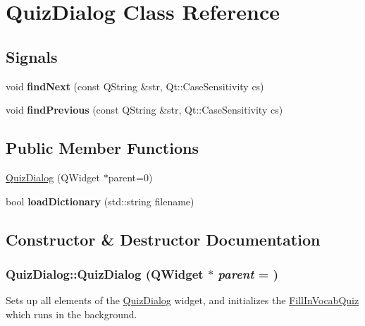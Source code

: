 \hypertarget{classQuizDialog}{
\section{QuizDialog Class Reference}
\label{classQuizDialog}
}
\subsection*{Signals}
\begin{DoxyCompactItemize}
\item 
\hypertarget{classQuizDialog_a958d04f6d98d7478d251562d649cc860}{
void {\bfseries findNext} (const QString \&str, Qt::CaseSensitivity cs)}
\label{classQuizDialog_a958d04f6d98d7478d251562d649cc860}

\item 
\hypertarget{classQuizDialog_a7f553273862f4b23f10cf0be184bb3c5}{
void {\bfseries findPrevious} (const QString \&str, Qt::CaseSensitivity cs)}
\label{classQuizDialog_a7f553273862f4b23f10cf0be184bb3c5}

\end{DoxyCompactItemize}
\subsection*{Public Member Functions}
\begin{DoxyCompactItemize}
\item 
\hyperlink{classQuizDialog_a705eca03231d2f3c68f93692b1854f7e}{QuizDialog} (QWidget $\ast$parent=0)
\item 
\hypertarget{classQuizDialog_a600b4998fbd46aab0085ed6520b99ea4}{
bool {\bfseries loadDictionary} (std::string filename)}
\label{classQuizDialog_a600b4998fbd46aab0085ed6520b99ea4}

\end{DoxyCompactItemize}


\subsection{Constructor \& Destructor Documentation}
\hypertarget{classQuizDialog_a705eca03231d2f3c68f93692b1854f7e}{
\subsubsection[{QuizDialog}]{\setlength{\rightskip}{0pt plus 5cm}QuizDialog::QuizDialog (QWidget $\ast$ {\em parent} = {})}}
\label{classQuizDialog_a705eca03231d2f3c68f93692b1854f7e}
Sets up all elements of the \hyperlink{classQuizDialog}{QuizDialog} widget, and initializes the \hyperlink{classFillInVocabQuiz}{FillInVocabQuiz} which runs in the background. 

